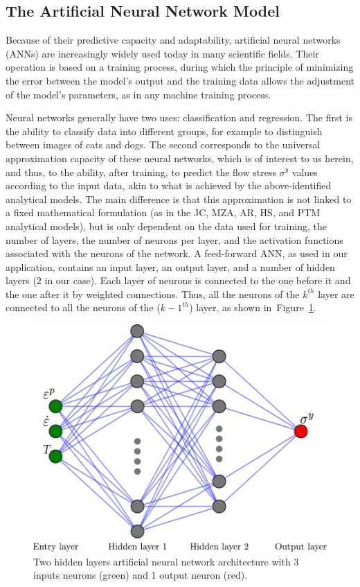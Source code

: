 \documentclass[metals,article,accept,pdftex,moreauthors]{Definitions/mdpi}
\begin{document}
\subsection{The Artificial Neural Network Model\label{sec:ANNmodel}}

Because of their predictive capacity and adaptability, artificial neural networks (ANNs) are increasingly widely used today in many scientific fields.
Their operation is based on a training process, during which the principle of minimizing the error between the model's output and the training data allows the adjustment of the model's parameters, as in any machine training process.

Neural networks generally have two uses: classification and regression.
The first is the ability to classify data into different groups, for example to distinguish between images of cats and dogs.
The second corresponds to the universal approximation capacity of these neural networks, which is of interest to us herein, and thus, to the ability, after training, to predict the flow stress $\sigma^y$ values according to the input data, akin to what is achieved by the above-identified analytical models.
The main difference is that this approximation is not linked to a fixed mathematical formulation (as in the JC, MZA, AR, HS, and PTM analytical models), but is only dependent on the data used for training, the number of layers, the number of neurons per layer, and the activation functions associated with the neurons of the network.
A feed-forward ANN, as used in our application, contains an input layer, an output layer, and a number of hidden layers ($2$ in our case).
Each layer of neurons is connected to the one before it and the one after it by weighted connections.
Thus, all the neurons of the $k^{th}$ layer are connected to all the neurons of the ($k-1^{th}$) layer, as shown in~Figure~\ref{fig:ANN-2HL}.

\vspace{-2pt}
\begin{figure}[H]

\includegraphics[width=0.7\columnwidth]
{Figures/ANN-scheme-2HL}
\caption{{Two} %
 hidden layers artificial neural network architecture with 3 inputs neurons (green) and 1 output neuron (red).}
\label{fig:ANN-2HL}
\end{figure}
\end{document}
